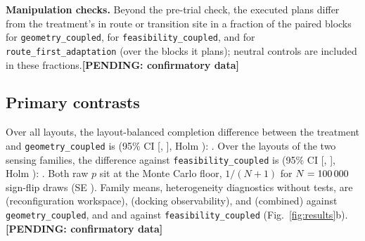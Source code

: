\documentclass[conference]{IEEEtran}
\newcommand{\pending}[1]{\textbf{[PENDING: #1]}}
\newcommand{\method}[1]{\texttt{#1}}
\newcommand{\withresults}[2]{\ifdefined\resTrials #1\else #2\fi}
\begin{document}
\withresults{\textbf{Manipulation checks.} Beyond the pre-trial check, the executed plans differ from the treatment's in route or transition site in a fraction \resDisagreeGeometry{} of the \resDisagreeBlocksGeometry{} paired blocks for \method{geometry\_coupled}, \resDisagreeFeasibility{} for \method{feasibility\_coupled}, and \resDisagreeRouteFirst{} for \method{route\_first\_adaptation} (over the \resDisagreeBlocksRouteFirst{} blocks it plans); neutral controls are included in these fractions.}{\pending{confirmatory data}}

\subsection{Primary contrasts}
\withresults{Over all \resLayoutsVsGeometry{} layouts, the layout-balanced completion difference between the treatment and \method{geometry\_coupled} is \resDeltaVsGeometry{} (95\% CI [\resCILowVsGeometry, \resCIHighVsGeometry], Holm \resHolmPVsGeometry): \resClaimVsGeometry. Over the \resLayoutsVsFeasibility{} layouts of the two sensing families, the difference against \method{feasibility\_coupled} is \resDeltaVsFeasibility{} (95\% CI [\resCILowVsFeasibility, \resCIHighVsFeasibility], Holm \resHolmPVsFeasibility): \resClaimVsFeasibility. Both raw $p$ sit at the Monte Carlo floor, $1/(N+1)$ for $N = \text{100\,000}$ sign-flip draws (SE \resMCSEVsGeometry). Family means, heterogeneity diagnostics without tests, are \resFamilyVsGeometryWorkspace{} (reconfiguration workspace), \resFamilyVsGeometryDocking{} (docking observability), and \resFamilyVsGeometryCombined{} (combined) against \method{geometry\_coupled}, and \resFamilyVsFeasibilityDocking{} and \resFamilyVsFeasibilityCombined{} against \method{feasibility\_coupled} (Fig.~\ref{fig:results}b).}{\pending{confirmatory data}}
\end{document}
